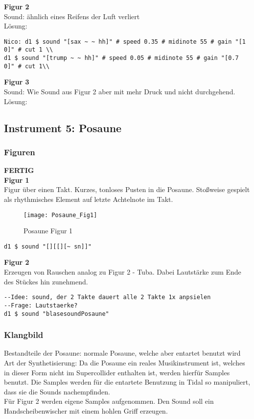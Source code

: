 \documentclass[
10pt, %
a4paper, %
oneside, %
headinclude,footinclude, %
BCOR5mm, %
]{scrartcl}
\begin{document}
\noindent\textbf{Figur 2}\\
Sound: ähnlich eines Reifens der Luft verliert\\
Lösung:\\
\begin{lstlisting}
Nico: d1 $ sound "[sax ~ ~ hh]" # speed 0.35 # midinote 55 # gain "[1 0]" # cut 1 \\
d1 $ sound "[trump ~ ~ hh]" # speed 0.05 # midinote 55 # gain "[0.7 0]" # cut 1\\
\end{lstlisting}

\noindent\textbf{Figur 3}\\
Sound: Wie Sound aus Figur 2 aber mit mehr Druck und nicht durchgehend.\\
Lösung:\\


\subsection{Instrument 5: Posaune}
\subsubsection{Figuren}
{\color{green}\textbf{FERTIG}} \\

\noindent\textbf{Figur 1}\\
Figur über einen Takt. Kurzes, tonloses Pusten in die Posaune. Stoßweise gespielt als rhythmisches Element auf letzte Achtelnote im Takt.\\
\begin{figure}[h]
	\centering 
	\texttt{[image: Posaune\_Fig1]} 
	\caption{Posaune Figur 1}
\end{figure}

\begin{lstlisting}
d1 $ sound "[][[][~ sn]]"
\end{lstlisting}


\noindent\textbf{Figur 2}\\
Erzeugen von Rauschen analog zu Figur 2 - Tuba. Dabei Lautstärke zum Ende des Stückes hin zunehmend.
\begin{lstlisting}
--Idee: sound, der 2 Takte dauert alle 2 Takte 1x anpsielen
--Frage: Lautstaerke?
d1 $ sound "blasesoundPosaune"
\end{lstlisting}

\subsubsection{Klangbild}
Bestandteile der Posaune: normale Posaune, welche aber entartet benutzt wird\\
Art der Synthetisierung: Da die Posaune ein reales Musikinstrument ist, welches in dieser Form nicht im Supercollider enthalten ist,
werden hierfür Samples benutzt. Die Samples werden für die entartete Benutzung in Tidal so manipuliert, dass sie die Sounds
nachempfinden.\\
Für Figur 2 werden eigene Samples aufgenommen. Den Sound soll ein Handscheibenwischer mit einem hohlen Griff erzeugen.
\end{document}
